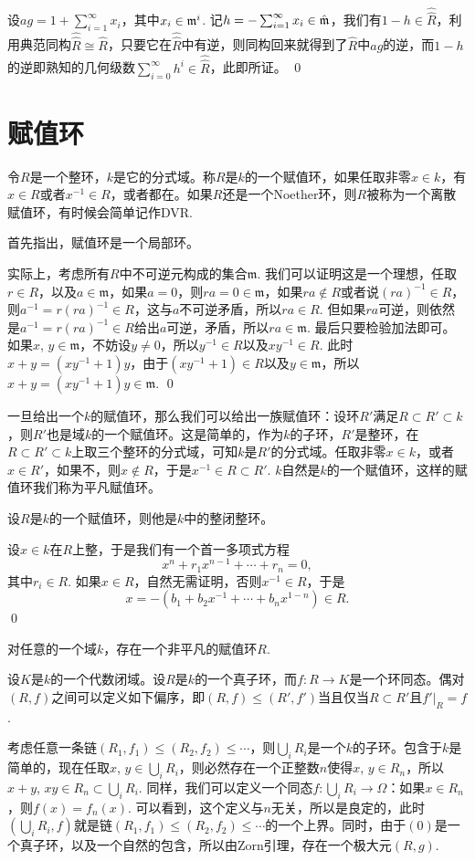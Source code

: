 	设$ag=1+\sum_{i=1}^\infty x_i$，其中$x_i\in \mathfrak{m}^i$. 记$h=-\sum_{i=1}^\infty x_i\in \hat{\mathfrak{m}}$，我们有$1-h\in \hat{\hat R}$，利用典范同构$\hat{\hat R}\cong \hat{R}$，只要它在$\hat{\hat R}$中有逆，则同构回来就得到了$\hat{R}$中$ag$的逆，而$1-h$的逆即熟知的几何级数$\sum_{i=0}^\infty h^i\in \hat{\hat R}$，此即所证。
\qed


\section{赋值环}

\para 令$R$是一个整环，$k$是它的分式域。称$R$是$k$的一个赋值环，如果任取非零$x\in k$，有$x\in R$或者$x^{-1}\in R$，或者都在。如果$R$还是一个Noether环，则$R$被称为一个离散赋值环，有时候会简单记作DVR.

首先指出，赋值环是一个局部环。

\proof 
	实际上，考虑所有$R$中不可逆元构成的集合$\mathfrak{m}$. 我们可以证明这是一个理想，任取$r\in R$，以及$a\in\mathfrak{m}$，如果$a=0$，则$ra=0\in \mathfrak{m}$，如果$ra\not\in R$或者说$(ra)^{-1}\in R$，则$a^{-1}=r(ra)^{-1}\in R$，这与$a$不可逆矛盾，所以$ra\in R$. 但如果$ra$可逆，则依然是$a^{-1}=r(ra)^{-1}\in R$给出$a$可逆，矛盾，所以$ra\in \mathfrak{m}$. 最后只要检验加法即可。如果$x$, $y\in\mathfrak{m}$，不妨设$y\neq 0$，所以$y^{-1}\in R$以及$xy^{-1}\in R$. 此时$x+y=(xy^{-1}+1)y$，由于$(xy^{-1}+1)\in R$以及$y\in\mathfrak{m}$，所以$x+y=(xy^{-1}+1)y\in \mathfrak{m}$.
\qed

\para 一旦给出一个$k$的赋值环，那么我们可以给出一族赋值环：设环$R'$满足$R\subset R'\subset k$，则$R'$也是域$k$的一个赋值环。这是简单的，作为$k$的子环，$R'$是整环，在$R\subset R'\subset k$上取三个整环的分式域，可知$k$是$R'$的分式域。任取非零$x\in k$，或者$x\in R'$，如果不，则$x\not\in R$，于是$x^{-1}\in R\subset R'$. $k$自然是$k$的一个赋值环，这样的赋值环我们称为平凡赋值环。

\pro 设$R$是$k$的一个赋值环，则他是$k$中的整闭整环。

\proof
	设$x\in k$在$R$上整，于是我们有一个首一多项式方程
	\[
		x^n+r_1x^{n-1}+\cdots+r_n=0,
	\]
	其中$r_i\in R$. 如果$x\in R$，自然无需证明，否则$x^{-1}\in R$，于是
	\[
		x=-(b_1+b_2x^{-1}+\cdots+b_n x^{1-n})\in R.
	\]
\qed

\pro 对任意的一个域$k$，存在一个非平凡的赋值环$R$.

\proof
	设$K$是$k$的一个代数闭域。设$R$是$k$的一个真子环，而$f:R\to K$是一个环同态。偶对$(R,f)$之间可以定义如下偏序，即$(R,f)\leq (R',f')$当且仅当$R\subset R'$且$f'|_R=f$.

	考虑任意一条链$(R_1,f_1)\leq (R_2,f_2)\leq \cdots$，则$\bigcup_i R_i$是一个$k$的子环。包含于$k$是简单的，现在任取$x$, $y\in \bigcup_i R_i$，则必然存在一个正整数$n$使得$x$, $y\in R_n$，所以$x+y$, $xy\in R_n\subset \bigcup_i R_i$. 同样，我们可以定义一个同态$f:\bigcup_i R_i\to \Omega$：如果$x\in R_n$，则$f(x)=f_n(x)$. 可以看到，这个定义与$n$无关，所以是良定的，此时$(\bigcup_i R_i,f)$就是链$(R_1,f_1)\leq (R_2,f_2)\leq \cdots$的一个上界。同时，由于$(0)$是一个真子环，以及一个自然的包含，所以由Zorn引理，存在一个极大元$(R,g)$.

